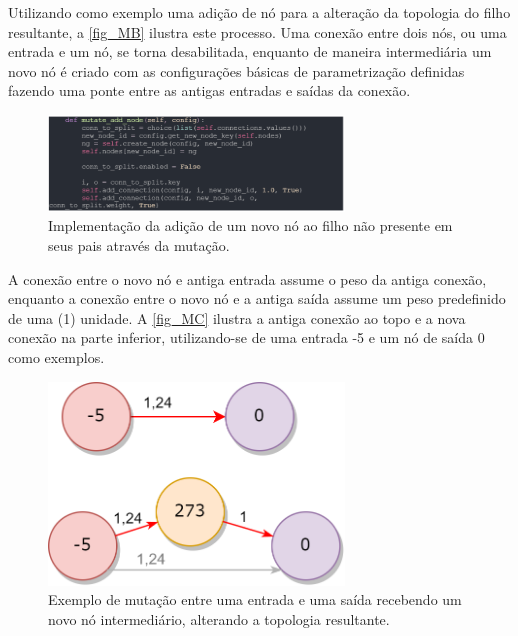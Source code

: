 Utilizando como exemplo uma adição de nó para a alteração da topologia do filho resultante, a \autoref{fig_MB} ilustra este processo. Uma conexão entre dois nós, ou uma entrada e um nó, se torna desabilitada, enquanto de maneira intermediária um novo nó é criado com as configurações básicas de parametrização definidas fazendo uma ponte entre as antigas entradas e saídas da conexão.

\begin{figure}[htb]
        \centering
        \caption{\label{fig_MB}Implementação da adição de um novo nó ao filho não presente em seus pais através da mutação.}
        \includegraphics[width=0.7\textwidth]{images/MB.png}
\end{figure}

A conexão entre o novo nó e antiga entrada assume o peso da antiga conexão, enquanto a conexão entre o novo nó e a antiga saída assume um peso predefinido de uma (1) unidade. A \autoref{fig_MC} ilustra a antiga conexão ao topo e a nova conexão na parte inferior, utilizando-se de uma entrada -5 e um nó de saída 0 como exemplos.

\begin{figure}[htb]
        \centering
        \caption{\label{fig_MC}Exemplo de mutação entre uma entrada e uma saída recebendo um novo nó intermediário, alterando a topologia resultante.}
        \includegraphics[width=0.7\textwidth]{images/MC.png}
\end{figure}

